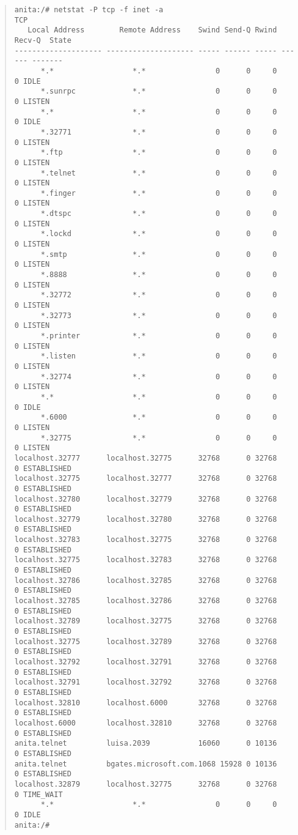 \begin{small}
\begin{quote}
\begin{verbatim}
anita:/# netstat -P tcp -f inet -a
TCP
   Local Address        Remote Address    Swind Send-Q Rwind Recv-Q  State
-------------------- -------------------- ----- ------ ----- ------ -------
      *.*                  *.*                0      0     0      0 IDLE
      *.sunrpc             *.*                0      0     0      0 LISTEN
      *.*                  *.*                0      0     0      0 IDLE
      *.32771              *.*                0      0     0      0 LISTEN
      *.ftp                *.*                0      0     0      0 LISTEN
      *.telnet             *.*                0      0     0      0 LISTEN
      *.finger             *.*                0      0     0      0 LISTEN
      *.dtspc              *.*                0      0     0      0 LISTEN
      *.lockd              *.*                0      0     0      0 LISTEN
      *.smtp               *.*                0      0     0      0 LISTEN
      *.8888               *.*                0      0     0      0 LISTEN
      *.32772              *.*                0      0     0      0 LISTEN
      *.32773              *.*                0      0     0      0 LISTEN
      *.printer            *.*                0      0     0      0 LISTEN
      *.listen             *.*                0      0     0      0 LISTEN
      *.32774              *.*                0      0     0      0 LISTEN
      *.*                  *.*                0      0     0      0 IDLE
      *.6000               *.*                0      0     0      0 LISTEN
      *.32775              *.*                0      0     0      0 LISTEN
localhost.32777      localhost.32775      32768      0 32768      0 ESTABLISHED
localhost.32775      localhost.32777      32768      0 32768      0 ESTABLISHED
localhost.32780      localhost.32779      32768      0 32768      0 ESTABLISHED
localhost.32779      localhost.32780      32768      0 32768      0 ESTABLISHED
localhost.32783      localhost.32775      32768      0 32768      0 ESTABLISHED
localhost.32775      localhost.32783      32768      0 32768      0 ESTABLISHED
localhost.32786      localhost.32785      32768      0 32768      0 ESTABLISHED
localhost.32785      localhost.32786      32768      0 32768      0 ESTABLISHED
localhost.32789      localhost.32775      32768      0 32768      0 ESTABLISHED
localhost.32775      localhost.32789      32768      0 32768      0 ESTABLISHED
localhost.32792      localhost.32791      32768      0 32768      0 ESTABLISHED
localhost.32791      localhost.32792      32768      0 32768      0 ESTABLISHED
localhost.32810      localhost.6000       32768      0 32768      0 ESTABLISHED
localhost.6000       localhost.32810      32768      0 32768      0 ESTABLISHED
anita.telnet         luisa.2039           16060      0 10136      0 ESTABLISHED
anita.telnet         bgates.microsoft.com.1068 15928 0 10136      0 ESTABLISHED
localhost.32879      localhost.32775      32768      0 32768      0 TIME_WAIT
      *.*                  *.*                0      0     0      0 IDLE
anita:/# 
\end{verbatim}
\end{quote}
\end{small}
